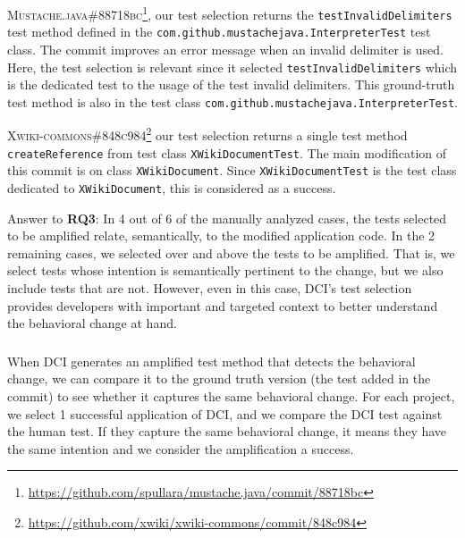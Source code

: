 \textsc{Mustache.java\#88718bc}\footnote{\url{https://github.com/spullara/mustache.java/commit/88718bc}}, our test selection returns the \texttt{testInvalidDelimiters} test method defined in the \texttt{com.github.mustachejava.InterpreterTest} test class.
The commit improves an error message when an invalid delimiter is used.
Here, the test selection is relevant since it selected \texttt{testInvalidDelimiters} which is the dedicated test to the usage of the test invalid delimiters.
This ground-truth test method is also in the test class \texttt{com.github.mustachejava.InterpreterTest}.

\textsc{Xwiki-commons\#848c984}\footnote{\url{https://github.com/xwiki/xwiki-commons/commit/848c984}} our test selection returns a single test method \texttt{createReference} from test class \texttt{XWikiDocumentTest}.
The main modification of this commit is on class \texttt{XWikiDocument}.
Since \texttt{XWikiDocumentTest} is the test class dedicated to \texttt{XWikiDocument}, this is considered as a success.

\begin{mdframed}
Answer to \textbf{RQ3}: 
In 4 out of 6 of the manually analyzed cases, the tests selected to be amplified relate, semantically, to the modified application code. 
In the 2 remaining cases, we selected over and above the tests to be amplified.
That is, we select tests whose intention is semantically pertinent to the change, but we also include tests that are not.
However, even in this case, DCI's test selection provides developers with important and targeted context to better understand the behavioral change at hand.
\end{mdframed}


\subsubsection{\rqhuman}
\label{subsubsec:answerq4}

When DCI generates an amplified test method that detects the behavioral change, we can compare it to the ground truth version (the test added in the commit) to see whether it captures the same behavioral change.
For each project, we select 1 successful application of DCI, and we compare the DCI test against the human test.
If they capture the same behavioral change, it means they have the same intention and we consider the amplification a success.

